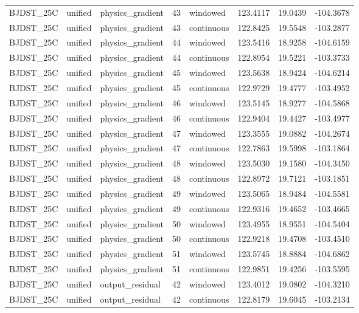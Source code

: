 \begin{tabular}{llllllll}
BJDST\_25C & unified & physics\_gradient & 43 & windowed & 123.4117 & 19.0439 & -104.3678 \\
BJDST\_25C & unified & physics\_gradient & 43 & continuous & 122.8425 & 19.5548 & -103.2877 \\
BJDST\_25C & unified & physics\_gradient & 44 & windowed & 123.5416 & 18.9258 & -104.6159 \\
BJDST\_25C & unified & physics\_gradient & 44 & continuous & 122.8954 & 19.5221 & -103.3733 \\
BJDST\_25C & unified & physics\_gradient & 45 & windowed & 123.5638 & 18.9424 & -104.6214 \\
BJDST\_25C & unified & physics\_gradient & 45 & continuous & 122.9729 & 19.4777 & -103.4952 \\
BJDST\_25C & unified & physics\_gradient & 46 & windowed & 123.5145 & 18.9277 & -104.5868 \\
BJDST\_25C & unified & physics\_gradient & 46 & continuous & 122.9404 & 19.4427 & -103.4977 \\
BJDST\_25C & unified & physics\_gradient & 47 & windowed & 123.3555 & 19.0882 & -104.2674 \\
BJDST\_25C & unified & physics\_gradient & 47 & continuous & 122.7863 & 19.5998 & -103.1864 \\
BJDST\_25C & unified & physics\_gradient & 48 & windowed & 123.5030 & 19.1580 & -104.3450 \\
BJDST\_25C & unified & physics\_gradient & 48 & continuous & 122.8972 & 19.7121 & -103.1851 \\
BJDST\_25C & unified & physics\_gradient & 49 & windowed & 123.5065 & 18.9484 & -104.5581 \\
BJDST\_25C & unified & physics\_gradient & 49 & continuous & 122.9316 & 19.4652 & -103.4665 \\
BJDST\_25C & unified & physics\_gradient & 50 & windowed & 123.4955 & 18.9551 & -104.5404 \\
BJDST\_25C & unified & physics\_gradient & 50 & continuous & 122.9218 & 19.4708 & -103.4510 \\
BJDST\_25C & unified & physics\_gradient & 51 & windowed & 123.5745 & 18.8884 & -104.6862 \\
BJDST\_25C & unified & physics\_gradient & 51 & continuous & 122.9851 & 19.4256 & -103.5595 \\
BJDST\_25C & unified & output\_residual & 42 & windowed & 123.4012 & 19.0802 & -104.3210 \\
BJDST\_25C & unified & output\_residual & 42 & continuous & 122.8179 & 19.6045 & -103.2134 \\

\end{tabular}
